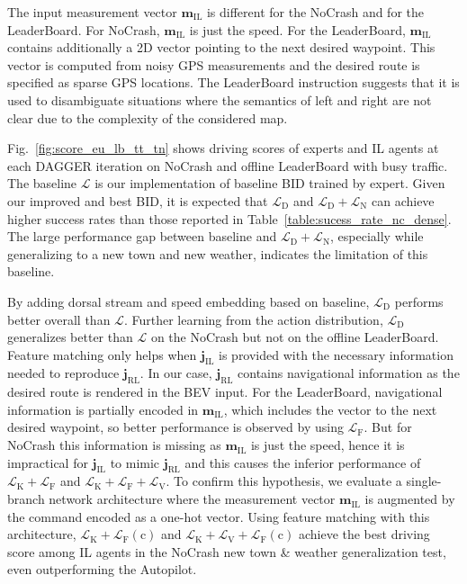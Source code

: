 The input measurement vector $\mathbf{m}_\text{IL}$ is different for the NoCrash and for the LeaderBoard. 
For NoCrash, $\mathbf{m}_\text{IL}$ is just the speed.
For the LeaderBoard, $\mathbf{m}_\text{IL}$ contains additionally a 2D vector pointing to the next desired waypoint.
This vector is computed from noisy GPS measurements and the desired route is specified as sparse GPS locations.
The LeaderBoard instruction suggests that it is used to disambiguate situations where the semantics of left and right are not clear due to the complexity of the considered map.


Fig.~\ref{fig:score_eu_lb_tt_tn} shows driving scores of experts and IL agents at each DAGGER iteration on NoCrash and offline LeaderBoard with busy traffic.
The baseline $\mathcal{L}$ is our implementation of baseline BID trained by expert. 
Given our improved and best BID, it is expected that $\mathcal{L}_\text{D}$ and $\mathcal{L}_\text{D} + \mathcal{L}_\text{N}$ can achieve higher success rates than those reported in Table~\ref{table:sucess_rate_nc_dense}.
The large performance gap between baseline and $\mathcal{L}_\text{D} + \mathcal{L}_\text{N}$, especially while generalizing to a new town and new weather, indicates the limitation of this baseline.


By adding dorsal stream and speed embedding based on baseline, $\mathcal{L}_\text{D}$ performs better overall than $\mathcal{L}$.
Further learning from the action distribution, $\mathcal{L}_\text{D}$ generalizes better than $\mathcal{L}$ on the NoCrash but not on the offline LeaderBoard.
Feature matching only helps when $\mathbf{j}_\text{IL}$ is provided with the necessary information needed to reproduce $\mathbf{j}_\text{RL}$.
In our case, $\mathbf{j}_\text{RL}$ contains navigational information as the desired route is rendered in the BEV input.
For the LeaderBoard, navigational information is partially encoded in $\mathbf{m}_\text{IL}$, which includes the vector to the next desired waypoint, so better performance is observed by using $\mathcal{L}_\text{F}$.
But for NoCrash this information is missing as $\mathbf{m}_\text{IL}$ is just the speed, hence it is impractical for $\mathbf{j}_\text{IL}$ to mimic $\mathbf{j}_\text{RL}$ and this causes the inferior performance of $\mathcal{L}_\text{K}+\mathcal{L}_\text{F}$ and $\mathcal{L}_\text{K}+\mathcal{L}_\text{F}+\mathcal{L}_\text{V}$.
To confirm this hypothesis, we evaluate a single-branch network architecture where the measurement vector $\mathbf{m}_\text{IL}$ is augmented by the command encoded as a one-hot vector.
Using feature matching with this architecture, $\mathcal{L}_\text{K}+\mathcal{L}_\text{F}(\text{c})$ and $\mathcal{L}_\text{K}+\mathcal{L}_\text{V}+\mathcal{L}_\text{F}(\text{c})$ achieve the best driving score among IL agents in the NoCrash new town \& weather generalization test, even outperforming the Autopilot.


